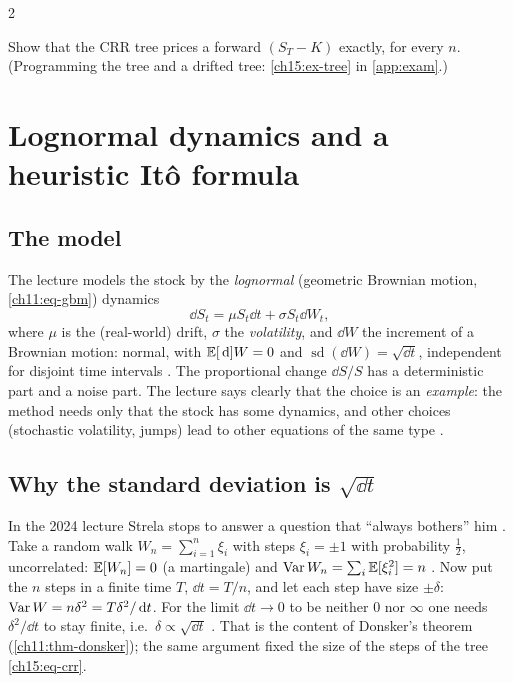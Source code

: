 \begin{paracol}{2}
\begin{exercise}\label{ch15:ex-tree-short}
Show that the CRR tree prices a forward $(S_T-K)$ exactly, for every $n$. (Programming the tree and a drifted tree: \cref{ch15:ex-tree} in \cref{app:exam}.)
\end{exercise}

\section{Lognormal dynamics and a heuristic It\^o formula}\label{ch15:sec-lognormal}

\subsection{The model}
The lecture models the stock by the \emph{lognormal} (geometric Brownian motion, \cref{ch11:eq-gbm}) dynamics
\begin{equation}\label{ch15:eq-gbm}
  \dd S_t=\mu S_t\dd t+\sigma S_t\dd W_t,
\end{equation}
where $\mu$ is the (real-world) drift, $\sigma$ the \emph{volatility}, and $\dd W$ the increment of a Brownian motion: normal, with
$\mathbb{E}[\,\mathrm{d}] W=0$ and $\operatorname{sd}(\dd W)=\sqrt{\dd t}$, independent for disjoint time intervals . The proportional change $\dd S/S$
has a deterministic part and a noise part. The lecture says clearly that the choice is an \emph{example}: the method needs only that the stock
has some dynamics, and other choices (stochastic volatility, jumps) lead to other equations of the same type
.

\subsection{Why the standard deviation is $\sqrt{\dd t}$}
In the 2024 lecture Strela stops to answer a question that ``always bothers'' him . Take a random walk $W_n=\sum_{i=1}^n\xi_i$ with steps $\xi_i=\pm1$ with
probability $\frac12$, uncorrelated: $\mathbb{E}[W_n]=0$ (a martingale) and $\operatorname{Var} W_n=\sum_i\mathbb{E}[\xi_i^2]=n$
. Now put the $n$ steps in a finite time $T$, $\dd t=T/n$, and let each step have size $\pm\delta$:
$\operatorname{Var} W=n\delta^2=T\delta^2/\,\mathrm{d} t$. For the limit $\dd t\to0$ to be neither $0$ nor $\infty$ one needs $\delta^2/\dd t$ to stay finite, i.e.\ $\delta\propto\sqrt{\dd t}$
. That is the content of Donsker's theorem (\cref{ch11:thm-donsker}); the same
argument fixed the size of the steps of the tree \eqref{ch15:eq-crr}.


\end{paracol}
